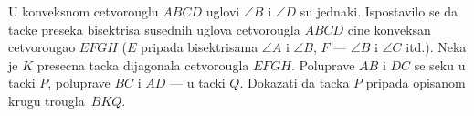 \problem
U konveksnom cetvorouglu $ABCD$ uglovi $\angle B$ i $\angle D$ su jednaki.
Ispostavilo se da tacke preseka bisektrisa susednih uglova cetvorougla $ABCD$ cine konveksan cetvorougao $EFGH$ ($E$ pripada bisektrisama $\angle A$ i $\angle B$, $F$ --- $\angle B$ i $\angle C$ itd.).
Neka je $K$ presecna tacka dijagonala cetvorougla $EFGH$.
Poluprave $AB$ i $DC$ se seku u tacki $P$, poluprave $BC$ i $AD$ --- u tacki $Q$.
Dokazati da tacka $P$ pripada opisanom krugu trougla~$BKQ$.
\solution
\endproblem

